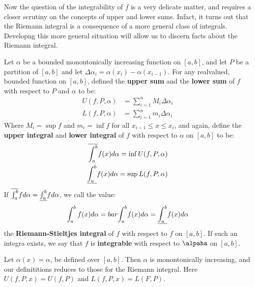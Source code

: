 Now the question of the integrability of $f$ is a very delicate matter, and
requires a closer scrutiny on the concepts of upper and lower sums. Infact, it
turns out that the Riemann integral is a consequence of a more general class of
integrals. Developng this more general situation will allow us to discern facts
about the Riemann integral.

\begin{definition}
    Let $\alpha$ be a bounded monontonically increasing function on  $[a,b]$,
    and let  $P$ be a partition of  $[a,b]$ and let
    $\Delta{\alpha_i}=\alpha(x_i)-\alpha(x_{i-1})$. For any realvalued, bounded
    function on  $[a,b]$, defined the \textbf{upper sum} and the \textbf{lower
    sum} of $f$ with respect to  $P$ and  $\alpha$ to be: 
        \begin{align}
            U(f,P,\alpha) &= \sum_{i=1}^{n}{M_i\Delta{\alpha_i}} \\		
            L(f,P,\alpha) &= \sum_{i=1}^{n}{m_i\Delta{\alpha_i}}
        \end{align}
        Where $M_i=\sup{f}$ and  $m_i=\inf{f}$ for all  $x_{i-1} \leq x \leq
        x_i$, and again, define the \textbf{upper integral} and  \textbf{lower
        integral} of $f$ with respect to  $\alpha$ on  $[a,b]$ to be:
            \begin{align}
                \overline{\int_{a}^{b}}{f(x)}d\alpha=\inf{U(f,P,\alpha)} \\
                \underline{\int_{a}^{b}}{f(x)}d\alpha=\sup{L(f,P,\alpha)}	
            \end{align}
            If $\overline{\int_{a}^{b}}{f}d\alpha=\underline{\int_{a}^{b}}{f}d\alpha$, we
            call the value:
                \begin{equation}
                    \int_{a}^{b}{f(x)}d\alpha=bar{\int_{a}^{b}}{f(x)}d\alpha=\underline{\int_{a}^{b}}{f(x)}d\alpha
                \end{equation}
            the \textbf{Riemann-Stieltjes integral} of $f$ with respect to  $f$
            on  $[a,b]$. If such an integra exists, we say that  $f$ is
            \textbf{integrable} with respect to  $\alpaha$ on  $[a,b]$.
\end{definition}

\begin{example}
    Let $\alpha(x)=\alpha$, be defined over  $[a,b]$. Then  $\alpha$ is
    monontonically increasing, and our definititions reduces to those for the
    Riemann integral. Here  $U(f,P,x)=U(f,P)$ and  $L(f,P,x)=L(F,P)$.
\end{example} 

